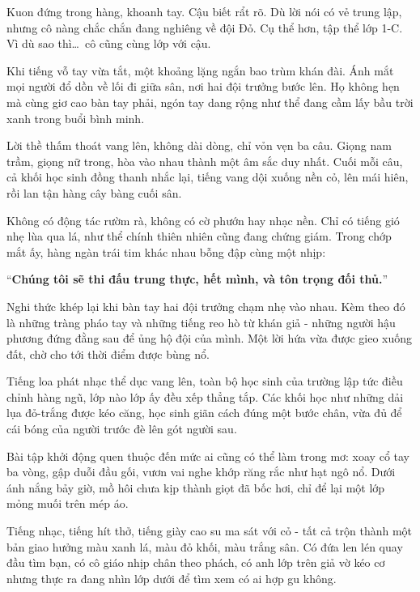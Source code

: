 \documentclass[../main.tex]{subfiles}
\begin{document}
Kuon đứng trong hàng, khoanh tay. Cậu biết rẩt rõ. Dù lời nói có vẻ trung lập, nhưng cô nàng chắc chắn đang nghiêng về đội Đỏ. Cụ thể hơn, tập thể lớp 1-C. Vì dù sao thì\dots\ cô cũng cùng lớp với cậu.

\ct

Khi tiếng vỗ tay vừa tắt, một khoảng lặng ngắn bao trùm khán đài. Ánh mắt mọi người đổ dồn về lối đi giữa sân, nơi hai đội trưởng bước lên. Họ không hẹn mà cùng giơ cao bàn tay phải, ngón tay dang rộng như thể đang cầm lấy bầu trời xanh trong buổi bình minh.

Lời thề thấm thoát vang lên, không dài dòng, chỉ vỏn vẹn ba câu. Giọng nam trầm, giọng nữ trong, hòa vào nhau thành một âm sắc duy nhất. Cuối mỗi câu, cả khối học sinh đồng thanh nhắc lại, tiếng vang dội xuống nền cỏ, lên mái hiên, rồi lan tận hàng cây bàng cuối sân.

Không có động tác rườm rà, không có cờ phướn hay nhạc nền.
Chỉ có tiếng gió nhẹ lùa qua lá, như thể chính thiên nhiên cũng đang chứng giám.
Trong chớp mắt ấy, hàng ngàn trái tim khác nhau bỗng đập cùng một nhịp:

\begin{center}
  ``\textbf{Chúng tôi sẽ thi đấu trung thực, hết mình, và tôn trọng đối thủ.}''
\end{center}

Nghi thức khép lại khi bàn tay hai đội trưởng chạm nhẹ vào nhau. Kèm theo đó là những tràng pháo tay và những tiếng reo hò từ khán giả - những người hậu phương đứng đằng sau để ủng hộ đội của mình. Một lời hứa vừa được gieo xuống đất, chờ cho tới thời điểm được bùng nổ.

\ct

Tiếng loa phát nhạc thể dục vang lên, toàn bộ học sinh của trường lập tức điều chỉnh hàng ngũ, lớp nào lớp ấy đều xếp thẳng tắp. Các khối học như những dải lụa đỏ-trắng được kéo căng, học sinh giãn cách đúng một bước chân, vừa đủ để cái bóng của người trước đè lên gót người sau.

Bài tập khởi động quen thuộc đến mức ai cũng có thể làm trong mơ: xoay cổ tay ba vòng, gập duỗi đầu gối, vươn vai nghe khớp răng rắc như hạt ngô nổ. Dưới ánh nắng bảy giờ, mồ hôi chưa kịp thành giọt đã bốc hơi, chỉ để lại một lớp mỏng muối trên mép áo.

Tiếng nhạc, tiếng hít thở, tiếng giày cao su  ma sát với cỏ - tất cả trộn thành một bản giao hưởng màu xanh lá, màu đỏ khối, màu trắng sân. Có đứa len lén quay đầu tìm bạn, có cô giáo nhịp chân theo phách, có anh lớp trên giả vờ kéo cơ nhưng thực ra đang nhìn lớp dưới để tìm xem có ai hợp gu không.
\end{document}
